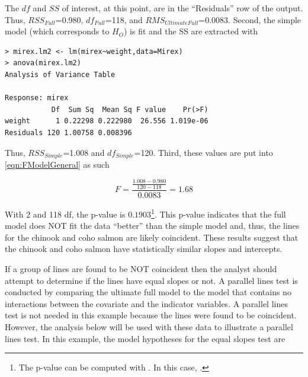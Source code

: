 \documentclass[10pt,openany]{book}\usepackage[]{graphicx}\usepackage[]{color}
\makeatletter
\newenvironment{kframe}{%
 \def\at@end@of@kframe{}%
 \ifinner\ifhmode%
  \def\at@end@of@kframe{\end{minipage}}%
  \begin{minipage}{\columnwidth}%
 \fi\fi%
 \def\FrameCommand##1{\hskip\@totalleftmargin \hskip-\fboxsep
 \colorbox{shadecolor}{##1}\hskip-\fboxsep
     \hskip-\linewidth \hskip-\@totalleftmargin \hskip\columnwidth}%
 \MakeFramed {\advance\hsize-\width
   \@totalleftmargin\z@ \linewidth\hsize
   \@setminipage}}%
 {\par\unskip\endMakeFramed%
 \at@end@of@kframe}
\newenvironment{knitrout}{}{} %
\makeatother
\begin{document}
The $df$ and $SS$ of interest, at this point, are in the ``Residuals'' row of the output.  Thus, $RSS_{Full}$=0.980, $df_{Full}$=118, and $RMS_{Ultimate Full}$=0.0083.  Second, the simple model (which corresponds to $H_{O}$) is fit and the SS are extracted with

\begin{knitrout}
\color{fgcolor}\begin{kframe}
\begin{verbatim}
> mirex.lm2 <- lm(mirex~weight,data=Mirex)
> anova(mirex.lm2)
Analysis of Variance Table

Response: mirex
           Df  Sum Sq  Mean Sq F value    Pr(>F)
weight      1 0.22298 0.222980  26.556 1.019e-06
Residuals 120 1.00758 0.008396                  
\end{verbatim}
\end{kframe}
\end{knitrout}

Thus, $RSS_{Simple}$=1.008 and $df_{Simple}$=120.  Third, these values are put into \eqref{eqn:FModelGeneral} as such

\[ F = \frac{\frac{1.008-0.980}{120-118}}{0.0083} = 1.68 \]

With 2 and 118 df, the p-value is $0.1903$\footnote{The p-value can be computed with .  In this case, .}.  This p-value indicates that the full model does NOT fit the data ``better'' than the simple model and, thus, the lines for the chinook and coho salmon are likely coincident.  These results suggest that the chinook and coho salmon have statistically similar slopes and intercepts.


\vspace{-12pt}

If a group of lines are found to be NOT coincident then the analyst should attempt to determine if the lines have equal slopes or not.  A parallel lines test is conducted by comparing the ultimate full model to the model that contains no interactions between the covariate and the indicator variables.  A parallel lines test is not needed in this example because the lines were found to be coincident.  However, the analysis below will be used with these data to illustrate a parallel lines test.  In this example, the model hypotheses for the equal slopes test are
\end{document}
